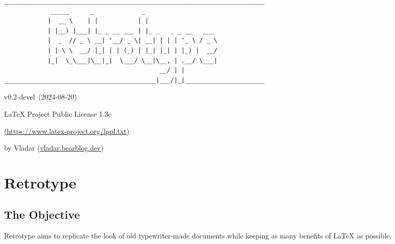 \documentclass[english,12pt,openany,letterpaper]{book}
\def\author{Vladar}
\def\license{LaTeX Project Public License 1.3c}
\def\licenselink{https://www.latex-project.org/lppl.txt}
\def\rtVer{0.2-devel}
\def\rtDate{2024-08-20}
\begin{document}

\begin{titlepage}

\begin{verbatim}
________________________________________________________________________
             _____      _             _                                 
            |  __ \    | |           | |                                
            | |__) |___| |_ _ __ ___ | |_ _   _ _ __   ___              
            |  _  // _ \ __| '__/ _ \| __| | | | '_ \ / _ \             
            | | \ \  __/ |_| | | (_) | |_| |_| | |_) |  __/             
            |_|  \_\___|\__|_|  \___/ \__|\__, | .__/ \___|             
                                           __/ | |
__________________________________________|___/|_|______________________
\end{verbatim}

{\hfill v\rtVer~(\rtDate)}

\vfill

\begin{adjustbox}{center}
\end{adjustbox}

\vfill
\vfill

{\hfill\license\hfill}

{\hfill\href{\licenselink}{(\licenselink)}\hfill}

{\hfill{}by \author{} (\href{https://vladar.bearblog.dev}{vladar.bearblog.dev})\hfill}

\end{titlepage}


\toc[3]

\chapter{Retrotype}

\clearBg
\clearFg

\rightbox[\baselineskip]{{\bfseries\itshape \rtDate}}

\section{The Objective}

Retrotype aims to replicate the look of old typewriter-made documents while keeping as many benefits of LaTeX as possible.
\end{document}

